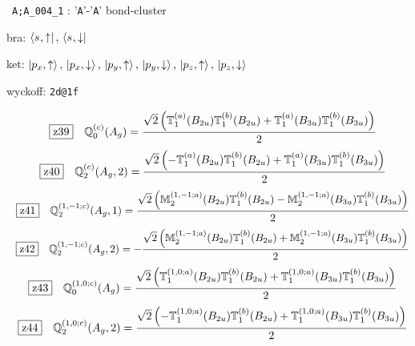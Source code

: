 \documentclass[fleqn,10pt,landscape]{jsarticle}
\begin{document}
\noindent\textbullet\, \texttt{A;A_004_1} : '\texttt{A}'-'\texttt{A}' bond-cluster

\noindent\quad * bra: $\bra{s_{},\uparrow},\, \bra{s_{},\downarrow}$

\noindent\quad * ket: $\ket{p_{x},\uparrow},\, \ket{p_{x},\downarrow},\, \ket{p_{y},\uparrow},\, \ket{p_{y},\downarrow},\, \ket{p_{z},\uparrow},\, \ket{p_{z},\downarrow}$

\noindent\quad * wyckoff: \texttt{2d@1f}

\begin{dmath*}
\hspace*{3mm}\fbox{z39}\quad \mathbb{Q}_{0}^{(c)}(A_{g})=\frac{\sqrt{2} \left(\mathbb{T}_{1}^{(a)}(B_{2u}) \mathbb{T}_{1}^{(b)}(B_{2u}) + \mathbb{T}_{1}^{(a)}(B_{3u}) \mathbb{T}_{1}^{(b)}(B_{3u})\right)}{2}
\end{dmath*}
\begin{dmath*}
\hspace*{3mm}\fbox{z40}\quad \mathbb{Q}_{2}^{(c)}(A_{g},2)=\frac{\sqrt{2} \left(- \mathbb{T}_{1}^{(a)}(B_{2u}) \mathbb{T}_{1}^{(b)}(B_{2u}) + \mathbb{T}_{1}^{(a)}(B_{3u}) \mathbb{T}_{1}^{(b)}(B_{3u})\right)}{2}
\end{dmath*}
\begin{dmath*}
\hspace*{3mm}\fbox{z41}\quad \mathbb{Q}_{2}^{(1,-1;c)}(A_{g},1)=\frac{\sqrt{2} \left(\mathbb{M}_{2}^{(1,-1;a)}(B_{2u}) \mathbb{T}_{1}^{(b)}(B_{2u}) - \mathbb{M}_{2}^{(1,-1;a)}(B_{3u}) \mathbb{T}_{1}^{(b)}(B_{3u})\right)}{2}
\end{dmath*}
\begin{dmath*}
\hspace*{3mm}\fbox{z42}\quad \mathbb{Q}_{2}^{(1,-1;c)}(A_{g},2)=- \frac{\sqrt{2} \left(\mathbb{M}_{2}^{(1,-1;a)}(B_{2u}) \mathbb{T}_{1}^{(b)}(B_{2u}) + \mathbb{M}_{2}^{(1,-1;a)}(B_{3u}) \mathbb{T}_{1}^{(b)}(B_{3u})\right)}{2}
\end{dmath*}
\begin{dmath*}
\hspace*{3mm}\fbox{z43}\quad \mathbb{Q}_{0}^{(1,0;c)}(A_{g})=\frac{\sqrt{2} \left(\mathbb{T}_{1}^{(1,0;a)}(B_{2u}) \mathbb{T}_{1}^{(b)}(B_{2u}) + \mathbb{T}_{1}^{(1,0;a)}(B_{3u}) \mathbb{T}_{1}^{(b)}(B_{3u})\right)}{2}
\end{dmath*}
\begin{dmath*}
\hspace*{3mm}\fbox{z44}\quad \mathbb{Q}_{2}^{(1,0;c)}(A_{g},2)=\frac{\sqrt{2} \left(- \mathbb{T}_{1}^{(1,0;a)}(B_{2u}) \mathbb{T}_{1}^{(b)}(B_{2u}) + \mathbb{T}_{1}^{(1,0;a)}(B_{3u}) \mathbb{T}_{1}^{(b)}(B_{3u})\right)}{2}
\end{dmath*}
\end{document}
